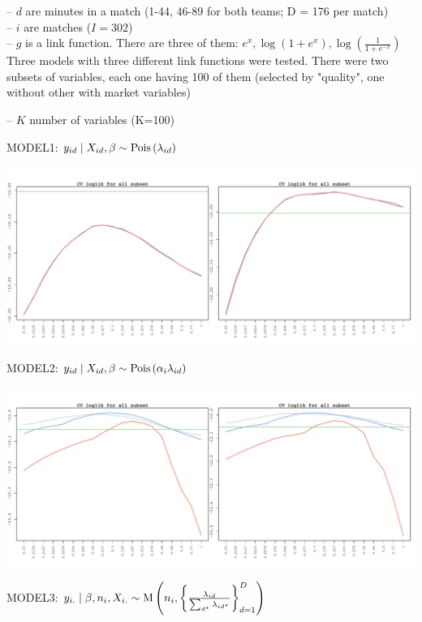 \documentclass[12pt, letter]{article}
\begin{document}
   -- $d$ are minutes in a match (1-44, 46-89 for both teams; D = 176 per match)\\
   -- $i$ are matches ($I=302$)\\
   -- $g$ is a link function. There are three of them: $e^x, \log(1+e^x), \log(\frac{1}{1+e^{-x}})$\\
 
 Three models with three different link functions were tested. There were two subsets of variables, each one having 100 of them (selected by "quality", one without other with market variables)
 
   -- $K$ number of variables (K=100)

\newpage
MODEL1: $y_{id}\mid X_{id}, \beta \sim \mathrm{Pois}\zag{\lambda_{id}}$

\includegraphics[width=6.5in]{basic.pdf}

 
\newpage
MODEL2: $y_{id}\mid X_{id}, \beta \sim \mathrm{Pois}\zag{\alpha_{i}\lambda_{id}}$

\includegraphics[width=6.5in]{basicMKT.pdf}



\newpage
MODEL3: $y_{i.}\mid \beta, n_i,  X_{i.}\sim \mathrm{M}
    \zag{n_i, \zagv{\frac{\lambda_{id}}{\sum_{d^\star}\lambda_{id^\star}}}_{d=1}^D}$
\end{document}
